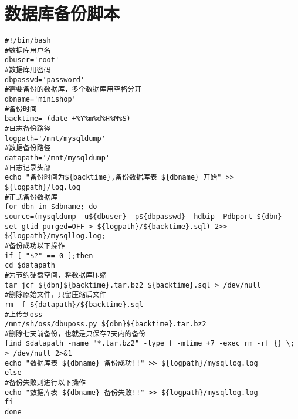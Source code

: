 \chapter{数据库备份脚本}
\label{cha:MysqlBackup}
\begin{lstlisting}[numbers=none]
#!/bin/bash
#数据库用户名
dbuser='root'
#数据库用密码
dbpasswd='password'
#需要备份的数据库，多个数据库用空格分开
dbname='minishop'
#备份时间
backtime= (date +%Y%m%d%H%M%S)
#日志备份路径
logpath='/mnt/mysqldump'
#数据备份路径
datapath='/mnt/mysqldump'
#日志记录头部
echo "备份时间为${backtime},备份数据库表 ${dbname} 开始" >> ${logpath}/log.log
#正式备份数据库
for dbn in $dbname; do
source=(mysqldump -u${dbuser} -p${dbpasswd} -hdbip -Pdbport ${dbn} --set-gtid-purged=OFF > ${logpath}/${backtime}.sql) 2>> ${logpath}/mysqllog.log;
#备份成功以下操作
if [ "$?" == 0 ];then
cd $datapath
#为节约硬盘空间，将数据库压缩
tar jcf ${dbn}${backtime}.tar.bz2 ${backtime}.sql > /dev/null
#删除原始文件，只留压缩后文件
rm -f ${datapath}/${backtime}.sql
#上传到oss
/mnt/sh/oss/dbuposs.py ${dbn}${backtime}.tar.bz2
#删除七天前备份，也就是只保存7天内的备份
find $datapath -name "*.tar.bz2" -type f -mtime +7 -exec rm -rf {} \; > /dev/null 2>&1
echo "数据库表 ${dbname} 备份成功!!" >> ${logpath}/mysqllog.log
else
#备份失败则进行以下操作
echo "数据库表 ${dbname} 备份失败!!" >> ${logpath}/mysqllog.log
fi
done
\end{lstlisting}